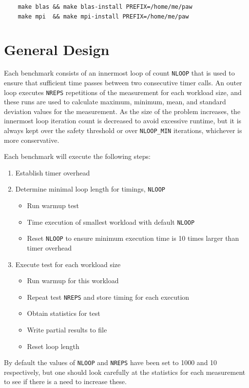 \documentclass[10pt,a4paper]{report}
\begin{document}
\begin{verbatim}
    make blas && make blas-install PREFIX=/home/me/paw
    make mpi  && make mpi-install PREFIX=/home/me/paw
\end{verbatim}

\FloatBarrier
\chapter{General Design}
Each benchmark consists of an innermost loop of count \verb+NLOOP+ that is used to ensure that sufficient time passes between two consecutive timer calls. An outer loop executes \verb+NREPS+ repetitions of the measurement for each workload size, and these runs are used to calculate maximum, minimum, mean, and standard deviation values for the measurement. As the size of the problem increases, the innermost loop iteration count is decreased to avoid excessive runtime, but it is always kept over the safety threshold or over \verb+NLOOP_MIN+ iterations, whichever is more conservative.

Each benchmark will execute the following steps:

\begin{enumerate}
\item Establish timer overhead
\item Determine minimal loop length for timings, \verb+NLOOP+
\begin{itemize}
	\item Run warmup test
	\item Time execution of smallest workload with default \verb+NLOOP+
	\item Reset \verb+NLOOP+ to ensure minimum execution time is 10 times larger than timer overhead
\end{itemize}
\item Execute test for each workload size
\begin{itemize}
	\item Run warmup for this workload
	\item Repeat test \verb+NREPS+ and store timing for each execution
	\item Obtain statistics for test
	\item Write partial results to file
	\item Reset loop length
\end{itemize}

\end{enumerate}

By default the values of \verb+NLOOP+ and \verb+NREPS+ have been set to 1000 and 10 respectively, but one should look carefully at the statistics for each measurement to see if there is a need to increase these.
\end{document}
